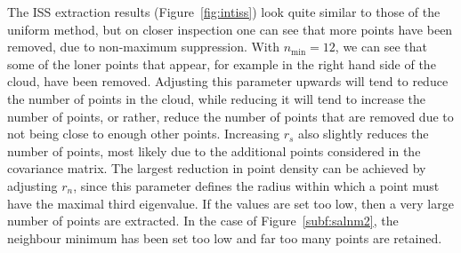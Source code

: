 \documentclass[11pt,a4paper]{kth-mag}
\begin{document}
The ISS extraction results (Figure~\ref{fig:intiss}) look quite similar to those
of the uniform method, but on closer inspection one can see that more points
have been removed, due to non-maximum suppression. With $n_{\min}=12$, we can
see that some of the loner points that appear, for example in the right hand
side of the cloud, have been removed. Adjusting this parameter upwards will tend
to reduce the number of points in the cloud, while reducing it will tend to
increase the number of points, or rather, reduce the number of points that are
removed due to not being close to enough other points. Increasing $r_s$ also
slightly reduces the number of points, most likely due to the additional points
considered in the covariance matrix. The largest reduction in point density can
be achieved by adjusting $r_n$, since this parameter defines the radius within
which a point must have the maximal third eigenvalue. If the values are set too
low, then a very large number of points are extracted. In the case of
Figure~\ref{subf:salnm2}, the neighbour minimum has been set too low and far too
many points are retained.
\end{document}
